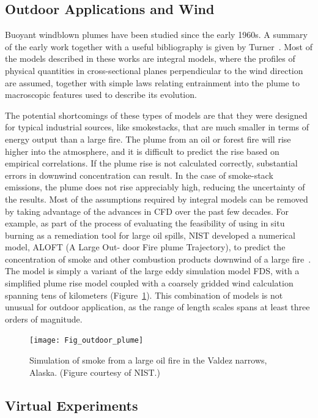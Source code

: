 \documentclass[graybox]{svmult}
\begin{document}
\subsection{Outdoor Applications and Wind}

Buoyant windblown plumes have been studied since the early 1960s. A summary of the early work together with a useful bibliography is given by Turner~\cite{Turner}. Most of the models described in these works are integral models, where the profiles of physical quantities in cross-sectional planes perpendicular to the wind direction are assumed, together with simple laws relating entrainment into the plume to macroscopic features used to describe its evolution.

The potential shortcomings of these types of models are that they were designed for typical industrial sources, like smokestacks, that are much smaller in terms of energy output than a large fire. The plume from an oil or forest fire will rise higher into the atmosphere, and it is difficult to predict the rise based on empirical correlations. If the plume rise is not calculated correctly, substantial errors in downwind concentration can result. In the case of smoke-stack emissions, the plume does not rise appreciably high, reducing the uncertainty of the results.
Most of the assumptions required by integral models can be removed by taking advantage of the advances in CFD over the past few decades. For example, as part of the process of evaluating the feasibility of using in situ burning as a remediation tool for large oil spills, NIST developed a numerical model, ALOFT (A Large Out- door Fire plume Trajectory), to predict the concentration of smoke and other combustion products downwind of a large fire~\cite{Baum}. The model is simply a variant of the large eddy simulation model FDS, with a simplified plume rise model coupled with a coarsely gridded wind calculation spanning tens of kilometers (Figure~\ref{ALOFT}). This combination of models is not unusual for outdoor application, as the range of length scales spans at least three orders of magnitude.

\begin{figure}[ht]
\texttt{[image: Fig\_outdoor\_plume]}
\caption{Simulation of smoke from a large oil fire in the Valdez narrows, Alaska. (Figure courtesy of NIST.)}
\label{ALOFT}
\end{figure}



\subsection{Virtual Experiments}
\end{document}
